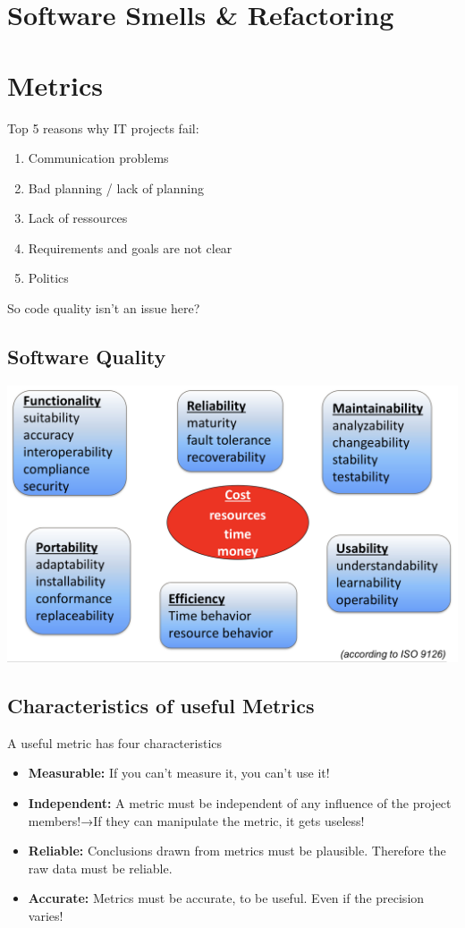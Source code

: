 \documentclass[10pt]{article}
\begin{document}
	
	\section{Software Smells \& Refactoring }
	\newpage
	
	\section{Metrics}
	Top 5 reasons why IT projects fail:
	\begin{enumerate}
		\item Communication problems
		\item Bad planning / lack of planning
		\item Lack of ressources
		\item Requirements and goals are not clear
		\item Politics
	\end{enumerate}
	So code quality isn’t an issue here?
	\subsection{Software Quality}
	\includegraphics[scale=0.4]{assets/software_quality}
	
	\subsection{Characteristics of useful Metrics}
	A useful metric has four characteristics
	\begin{itemize}
		\item \textbf{Measurable:} If you can’t measure it, you can’t use it!
		\item \textbf{Independent:} A metric must be independent of any influence of the project members!→If they can manipulate the metric, it gets useless!
		\item \textbf{Reliable:} Conclusions drawn from metrics must be plausible. Therefore the raw data must be reliable.
		\item \textbf{Accurate:} Metrics must be accurate, to be useful. Even if the precision varies!
	\end{itemize}
\end{document}
